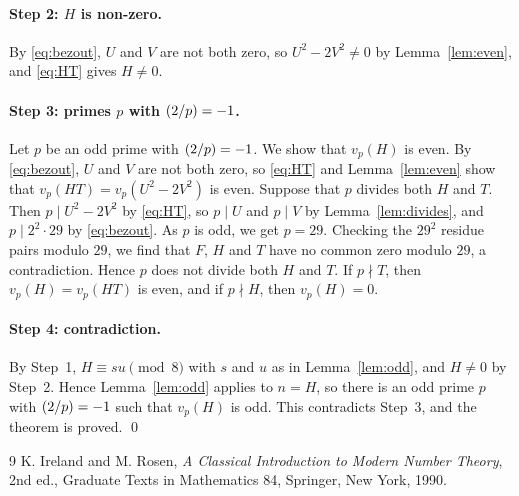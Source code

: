 \documentclass[11pt]{article}
\newcommand{\leg}[2]{\mathchoice{\biggl(\dfrac{#1}{#2}\biggr)}{(#1/#2)}{(#1/#2)}{(#1/#2)}}
\begin{document}
\paragraph{Step 2: $H$ is non-zero.} By \eqref{eq:bezout}, $U$ and $V$ are not both zero, so $U^2-2V^2\neq0$ by Lemma~\ref{lem:even}, and \eqref{eq:HT} gives $H\neq0$.

\paragraph{\texorpdfstring{Step 3: primes $p$ with $\leg{2}{p}=-1$.}{Step 3: inert primes.}} Let $p$ be an odd prime with $\leg{2}{p}=-1$. We show that $v_p(H)$ is even. By \eqref{eq:bezout}, $U$ and $V$ are not both zero, so \eqref{eq:HT} and Lemma~\ref{lem:even} show that $v_p(HT)=v_p(U^2-2V^2)$ is even. Suppose that $p$ divides both $H$ and $T$. Then $p\mid U^2-2V^2$ by \eqref{eq:HT}, so $p\mid U$ and $p\mid V$ by Lemma~\ref{lem:divides}, and $p\mid 2^{2}\cdot 29$ by \eqref{eq:bezout}. As $p$ is odd, we get $p=29$. Checking the $29^2$ residue pairs modulo $29$, we find that $F$, $H$ and $T$ have no common zero modulo $29$, a contradiction. Hence $p$ does not divide both $H$ and $T$. If $p\nmid T$, then $v_p(H)=v_p(HT)$ is even, and if $p\nmid H$, then $v_p(H)=0$.

\paragraph{Step 4: contradiction.} By Step~1, $H\equiv su\pmod{8}$ with $s$ and $u$ as in Lemma~\ref{lem:odd}, and $H\neq0$ by Step~2. Hence Lemma~\ref{lem:odd} applies to $n=H$, so there is an odd prime $p$ with $\leg{2}{p}=-1$ such that $v_p(H)$ is odd. This contradicts Step~3, and the theorem is proved.
\qed

\begin{thebibliography}{9}
 K. Ireland and M. Rosen, \emph{A Classical Introduction to Modern Number Theory}, 2nd ed., Graduate Texts in Mathematics 84, Springer, New York, 1990.
\end{thebibliography}
\end{document}
